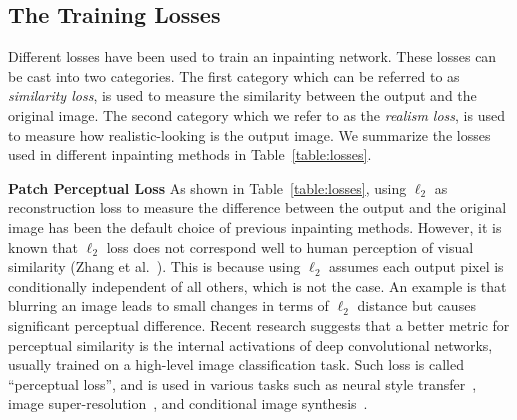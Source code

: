 \subsection{The Training Losses}
Different losses have been used to train an inpainting network. These losses can be cast into two categories. The first category which can be referred to as \textit{similarity loss}, is used to measure the similarity between the output and the original image. The second category which we refer to as the \textit{realism loss}, is used to measure how realistic-looking is the output image. We summarize the losses used in different inpainting methods in Table~\ref{table:losses}. 

\begin{table}[h!]
\begin{center}
  \end{center}
  \caption{Comparison of training losses used in different methods.}
  \label{table:losses}
\end{table}

\noindent\textbf{Patch Perceptual Loss} As shown in Table~\ref{table:losses}, using $\ell_2$ as reconstruction loss to measure the difference between the output and the original image has been the default choice of previous inpainting methods. However, it is known that $\ell_2$ loss does not correspond well to human perception of visual similarity (Zhang et al.~\cite{zhang2018unreasonable}). This is because using $\ell_2$ assumes each output pixel is conditionally independent of all others, which is not the case. An example is that blurring an image leads to small changes in terms of $\ell_2$ distance but causes significant perceptual difference. Recent research suggests that a better metric for perceptual similarity is the internal activations of deep convolutional networks, usually trained on a high-level image classification task. Such loss is called ``perceptual loss'', and is used in various tasks such as neural style transfer~\cite{gatys2016image}, image super-resolution~\cite{johnson2016perceptual}, and conditional image synthesis~\cite{dosovitskiy2016generating,chen2017photographic}.

